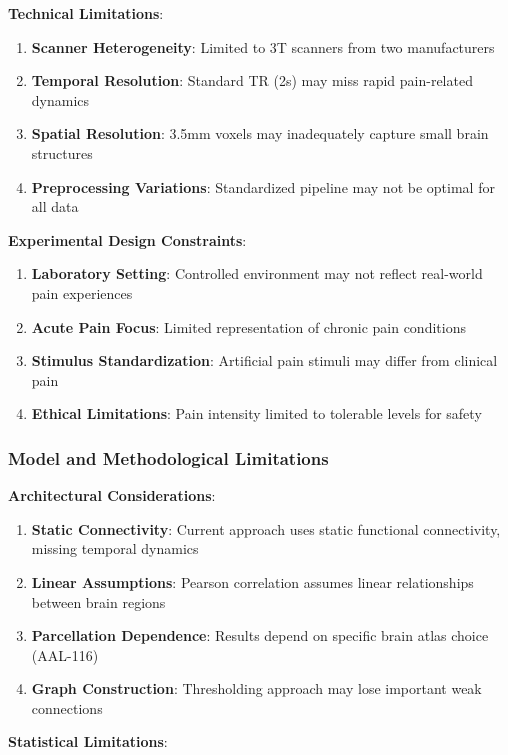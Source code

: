 \textbf{Technical Limitations}:

\begin{enumerate}
\item \textbf{Scanner Heterogeneity}: Limited to 3T scanners from two manufacturers
\item \textbf{Temporal Resolution}: Standard TR (2s) may miss rapid pain-related dynamics
\item \textbf{Spatial Resolution}: 3.5mm voxels may inadequately capture small brain structures
\item \textbf{Preprocessing Variations}: Standardized pipeline may not be optimal for all data
\end{enumerate}

\textbf{Experimental Design Constraints}:

\begin{enumerate}
\item \textbf{Laboratory Setting}: Controlled environment may not reflect real-world pain experiences
\item \textbf{Acute Pain Focus}: Limited representation of chronic pain conditions
\item \textbf{Stimulus Standardization}: Artificial pain stimuli may differ from clinical pain
\item \textbf{Ethical Limitations}: Pain intensity limited to tolerable levels for safety
\end{enumerate}

\subsubsection{Model and Methodological Limitations}

\textbf{Architectural Considerations}:

\begin{enumerate}
\item \textbf{Static Connectivity}: Current approach uses static functional connectivity, missing temporal dynamics
\item \textbf{Linear Assumptions}: Pearson correlation assumes linear relationships between brain regions
\item \textbf{Parcellation Dependence}: Results depend on specific brain atlas choice (AAL-116)
\item \textbf{Graph Construction}: Thresholding approach may lose important weak connections
\end{enumerate}

\textbf{Statistical Limitations}:

